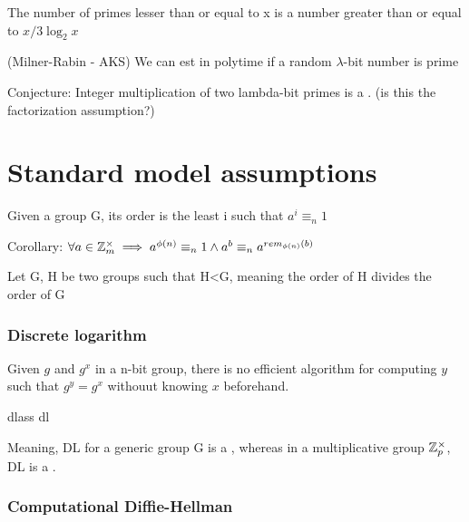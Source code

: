 \begin{theorem}
    The number of primes lesser than or equal to x is a number greater than or equal to $x/3\log_2x$
\end{theorem}

\begin{theorem} (Milner-Rabin - AKS)
    We can est in polytime if a random $\lambda$-bit number is prime
\end{theorem}

Conjecture: Integer multiplication of two lambda-bit primes is a \owf. (is this the factorization assumption?)

\section{Standard model assumptions}

Given a group G, its order is the least i such that $a^i \equiv_n 1$ 

Corollary: $\forall a \in \mathbb{Z}_m^\times \implies a^{\phi(n)} \equiv_n 1 \wedge a^b \equiv_n a^{rem_{\phi(n)}(b)}$

\begin{theorem}
    Let G, H be two groups such that H<G, meaning the order of H divides the order of G
\end{theorem}


\subsubsection{Discrete logarithm}

Given $g$ and $g^x$ in a n-bit group, there is no efficient algorithm for computing $y$ such that $g^y = g^x$ withouut knowing $x$ beforehand.

\begin{cryptogame}
    {dlass}
    {}
    {dl}


    
\end{cryptogame}

Meaning, DL for a generic group G is a \owf, whereas in a multiplicative group $\mathbb{Z}_p^\times$, DL is a \owp.

\subsubsection{Computational Diffie-Hellman}

